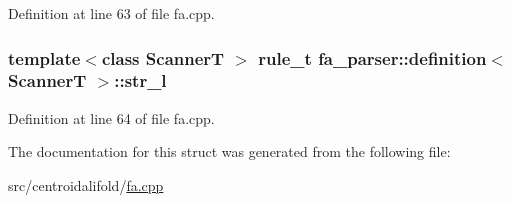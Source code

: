 Definition at line 63 of file fa.\+cpp.

\hypertarget{structfa__parser_1_1definition_a458a9f843e27dd3579418e2f1f39d4d0}{
\subsubsection[{str\+\_\+l}]{\setlength{\rightskip}{0pt plus 5cm}template$<$class Scanner\+T $>$ {\bf rule\+\_\+t} {\bf fa\+\_\+parser\+::definition}$<$ Scanner\+T $>$\+::str\+\_\+l}}\label{structfa__parser_1_1definition_a458a9f843e27dd3579418e2f1f39d4d0}


Definition at line 64 of file fa.\+cpp.



The documentation for this struct was generated from the following file\+:\begin{DoxyCompactItemize}
\item 
src/centroidalifold/\hyperlink{centroidalifold_2fa_8cpp}{fa.\+cpp}\end{DoxyCompactItemize}
